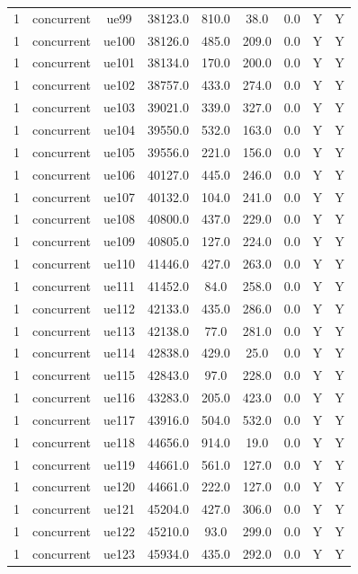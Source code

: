 \begin{table}[ht]
\begin{tabular}{|c|c|c|c|c|c|c|c|c|}
1 & concurrent & ue99 & 38123.0 & 810.0 & 38.0 & 0.0 & Y & Y \\
1 & concurrent & ue100 & 38126.0 & 485.0 & 209.0 & 0.0 & Y & Y \\
1 & concurrent & ue101 & 38134.0 & 170.0 & 200.0 & 0.0 & Y & Y \\
1 & concurrent & ue102 & 38757.0 & 433.0 & 274.0 & 0.0 & Y & Y \\
1 & concurrent & ue103 & 39021.0 & 339.0 & 327.0 & 0.0 & Y & Y \\
1 & concurrent & ue104 & 39550.0 & 532.0 & 163.0 & 0.0 & Y & Y \\
1 & concurrent & ue105 & 39556.0 & 221.0 & 156.0 & 0.0 & Y & Y \\
1 & concurrent & ue106 & 40127.0 & 445.0 & 246.0 & 0.0 & Y & Y \\
1 & concurrent & ue107 & 40132.0 & 104.0 & 241.0 & 0.0 & Y & Y \\
1 & concurrent & ue108 & 40800.0 & 437.0 & 229.0 & 0.0 & Y & Y \\
1 & concurrent & ue109 & 40805.0 & 127.0 & 224.0 & 0.0 & Y & Y \\
1 & concurrent & ue110 & 41446.0 & 427.0 & 263.0 & 0.0 & Y & Y \\
1 & concurrent & ue111 & 41452.0 & 84.0 & 258.0 & 0.0 & Y & Y \\
1 & concurrent & ue112 & 42133.0 & 435.0 & 286.0 & 0.0 & Y & Y \\
1 & concurrent & ue113 & 42138.0 & 77.0 & 281.0 & 0.0 & Y & Y \\
1 & concurrent & ue114 & 42838.0 & 429.0 & 25.0 & 0.0 & Y & Y \\
1 & concurrent & ue115 & 42843.0 & 97.0 & 228.0 & 0.0 & Y & Y \\
1 & concurrent & ue116 & 43283.0 & 205.0 & 423.0 & 0.0 & Y & Y \\
1 & concurrent & ue117 & 43916.0 & 504.0 & 532.0 & 0.0 & Y & Y \\
1 & concurrent & ue118 & 44656.0 & 914.0 & 19.0 & 0.0 & Y & Y \\
1 & concurrent & ue119 & 44661.0 & 561.0 & 127.0 & 0.0 & Y & Y \\
1 & concurrent & ue120 & 44661.0 & 222.0 & 127.0 & 0.0 & Y & Y \\
1 & concurrent & ue121 & 45204.0 & 427.0 & 306.0 & 0.0 & Y & Y \\
1 & concurrent & ue122 & 45210.0 & 93.0 & 299.0 & 0.0 & Y & Y \\
1 & concurrent & ue123 & 45934.0 & 435.0 & 292.0 & 0.0 & Y & Y \\

\end{tabular}
\end{table}

